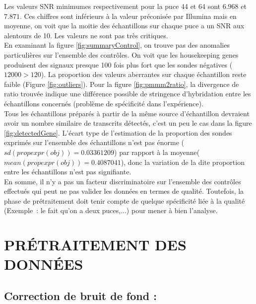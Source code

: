 \documentclass[a4paper,10pt]{article}
\begin{document}
Les valeurs SNR minimumes respectivement pour la puce 44 et 64 sont $6.968$ et $7.871$. Ces chiffres sont inférieurs à la valeur préconisée par Illumina mais en moyenne, on voit que la moitie des échantillons sur chaque puce a un SNR aux alentours de 10. Les valeurs ne sont pas très critiques.
\\En examinant la figure \ref{fig:summaryControl}, on trouve pas des anomalies particulières sur l’ensemble des contrôles. On voit que les  housekeeping genes produisent des signaux presque 100 fois plus fort que les sondes négatives ($12000 > 120$).
La proportion des valeurs aberrantes sur chaque échantillon reste faible (Figure \ref{fig:outliers}). 
Pour la figure \ref{fig:pmmm2ratio}, la divergence de ratio trouvée indique une différence possible de stringence d’hybridation entre les échantillons concernés (problème de spécificité dans l’expérience). \\
Tous les échantillons préparés à partir de la même source d’échantillon devraient avoir un nombre similaire de transcrits détectés, c'est un peu le cas dans la figure \ref{fig:detectedGene}.
L’écart type de l’estimation de la proportion des sondes exprimés sur l’ensemble des échantillons n’est pas énorme ($sd(propexpr(obj))=0.03361209$) par rapport à la moyenne($mean(propexpr(obj))=0.4087041$), donc la variation de la dite proportion entre les échantillons n'est pas signifiante.
\\En somme, il n’y a pas un facteur discriminatoire sur l’ensemble des contrôles effectués qui peut ne pas valider les données en termes de qualité. Toutefois, la phase de prétraitement doit tenir compte de quelque spécificité liée à la qualité (Exemple : le fait qu’on a deux puces,...) pour mener à bien l'analyse.
\section{PR\'{E}TRAITEMENT DES DONN\'{E}ES }
\subsection{Correction de bruit de fond :}
\end{document}
